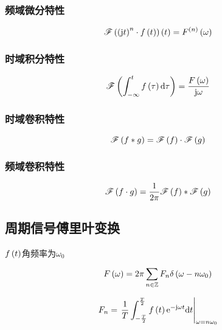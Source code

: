 \documentclass{article}
\begin{document}
\subsubsection{频域微分特性}

\[\mathscr F\left(\left(\mathrm j t\right)^n\cdot f\left(t\right)\right)\left(t\right)=F^{\left(n\right)}\left(\omega\right)\]

\subsubsection{时域积分特性}

\[\mathscr F\left(\int_{-\infty}^tf\left(\tau\right)\mathrm d\tau\right)=\frac{F\left(\omega\right)}{\mathrm j\omega}\]

\subsubsection{时域卷积特性}

\[\mathscr F\left(f\ast g\right)=\mathscr F\left(f\right)\cdot\mathscr F\left(g\right)\]

\subsubsection{频域卷积特性}

\[\mathscr F\left(f\cdot g\right)=\frac1{2\pi}\mathscr F\left(f\right)\ast\mathscr F\left(g\right)\]

\subsection{周期信号傅里叶变换}

$f\left(t\right)$角频率为$\omega_0$

\[F\left(\omega\right)=2\pi\sum_{n\in\mathbb Z}F_n\delta\left(\omega-n\omega_0\right)\]

\[F_n=\left.\frac1T\int_{-\frac T2}^{\frac T2}f\left(t\right)\mathrm e^{-\mathrm j\omega t}\mathrm d t\right|_{\omega=n\omega_0}\]
\end{document}
